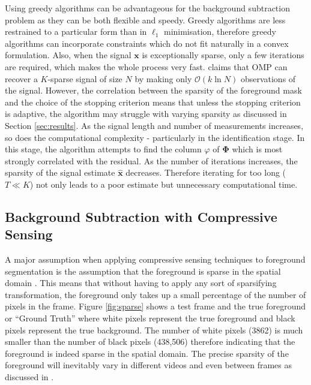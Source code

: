 Using greedy algorithms can be advantageous for the background subtraction problem as they can be both flexible and speedy. Greedy algorithms are less restrained to a particular form than in $\ell_1$ minimisation, therefore greedy algorithms can incorporate constraints which do not fit naturally in a convex formulation. Also, when the signal $\boldsymbol{x}$ is exceptionally sparse, only a few iterations are required, which makes the whole process very fast. \cite{tropp2007} claims that OMP can recover a $K$-sparse signal of size $N$ by making only $\mathcal{O}(k \ln N)$ observations of the signal. However, the correlation between the sparsity of the foreground mask and the choice of the stopping criterion means that unless the stopping criterion is adaptive, the algorithm may struggle with varying sparsity as discussed in Section \ref{sec:results}. As the signal length and number of measurements increases, so does the computational complexity - particularly in the identification stage. In this stage, the algorithm attempts to find the column $\varphi$ of $\boldsymbol{\Phi}$ which is most strongly correlated with the residual. As the number of iterations increases, the sparsity of the signal estimate $\boldsymbol{\hat{x}}$ decreases. Therefore iterating for too long ($T \ll K$) not only leads to a poor estimate but unnecessary computational time. 

  

\subsection{Background Subtraction with Compressive Sensing}
\label{sec:backgr-subtr-with}

A major assumption when applying compressive sensing techniques to foreground segmentation is the assumption that the foreground is sparse in the spatial domain  \cite{Cevher2008b}. This means that without having to apply any sort of sparsifying transformation, the foreground only takes up a small percentage of the number of pixels in the frame. Figure \ref{fig:sparse} shows a test frame and the true foreground or ``Ground Truth'' where white pixels represent the true foreground and black pixels represent the true background. The number of white pixels (3862) is much smaller than the number of black pixels (438,506) therefore indicating that the foreground is indeed sparse in the spatial domain. The precise sparsity of the foreground will inevitably vary in different  videos and even between frames as discussed in \cite{Warnell2011}. 

